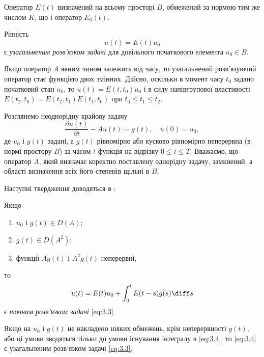 Оператор $E(t)$ визначений на всьому просторі $B$, обмежений за нормою тим же числом $K$, що і оператор $E_0(t)$. 

\begin{definition}
    Рівність 
    \begin{equation*}
        u(t) = E(t) u_0
    \end{equation*}
    є \textit{узагальненим розв'язком задачі} для довільного початкового елемента $u_0 \in B$.
\end{definition}

Якщо оператор $A$ явним чином залежить від часу, то узагальнений розв'язуючий оператор стає функцією двох змінних. Дійсно, оскільки в момент часу $t_0$ задано початковий стан $u_0$, то $u(t) = E(t, t_0) u_0$ і в силу напівгрупової властивості $E(t_2, t_0) = E(t_2, t_1) E(t_1, t_0)$ при $t_0 \le t_1 \le t_2$. \medskip

Розглянемо неоднорідну крайову задачу
\begin{equation}
    \label{eq:3.3}
    \frac{\partial u(t)}{\partial t} - A u(t) = g(t), \quad u(0) = u_0,
\end{equation}
де $u_0$ і $g(t)$ задані, а $g(t)$ рівномірно або кусково рівномірно неперервна (в  нормі простору $B$) за часом $t$ функція на відрізку $0 \le t \le T$. Вважаємо, що оператор $A$, який визначає коректно поставлену однорідну задачу, замкнений, а області визначення всіх його степенів щільні в $B$. \medskip

Наступні твердження доводяться в \cite{richtmyer1972}:
\begin{proposition}
    Якщо 
    \begin{enumerate}
        \item $u_0$ і $g(t) \in D(A)$; 
        \item $g(t) \in D(A^2)$; 
        \item функції $A g(t)$ і $A^2 g(t)$ неперервні,
    \end{enumerate}
    то 
    \begin{equation}
        \label{eq:3.4}
        u(t) = E(t) u_0 + \int_0^t E(t - s) g(s) \diff s
    \end{equation}
    є \textit{точним розв'язком задачі} \eqref{eq:3.3}.
\end{proposition}

\begin{proposition}
    Якщо на $u_0$ і $g(t)$  не накладено ніяких обмежень, крім неперервності $g(t)$, або ці умови зводяться тільки до умови існування інтегралу в \eqref{eq:3.4}, то \eqref{eq:3.4} є узагальненим розв'язком задачі \eqref{eq:3.3}.
\end{proposition}

